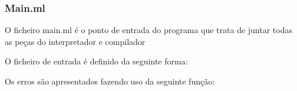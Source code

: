 \subsubsection{Main.ml}
\label{sec2:subsubsec:main}

O ficheiro main.ml é o ponto de entrada do programa que trata de juntar todas as peças do interpretador e compilador



O ficheiro de entrada é definido da seguinte forma:


\clearpage

Os erros são apresentados fazendo uso da seguinte função:


